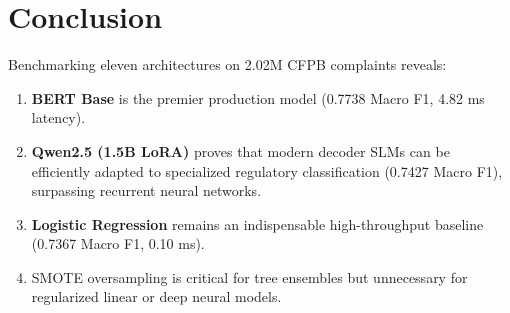 \documentclass[11pt,a4paper,twocolumn]{article}
\begin{document}
\section{Conclusion}
Benchmarking eleven architectures on 2.02M CFPB complaints reveals:
\begin{enumerate}
    \item \textbf{BERT Base} is the premier production model (0.7738 Macro F1, 4.82 ms latency).
    \item \textbf{Qwen2.5 (1.5B LoRA)} proves that modern decoder SLMs can be efficiently adapted to specialized regulatory classification (0.7427 Macro F1), surpassing recurrent neural networks.
    \item \textbf{Logistic Regression} remains an indispensable high-throughput baseline (0.7367 Macro F1, 0.10 ms).
    \item SMOTE oversampling is critical for tree ensembles but unnecessary for regularized linear or deep neural models.
\end{enumerate}
\end{document}
